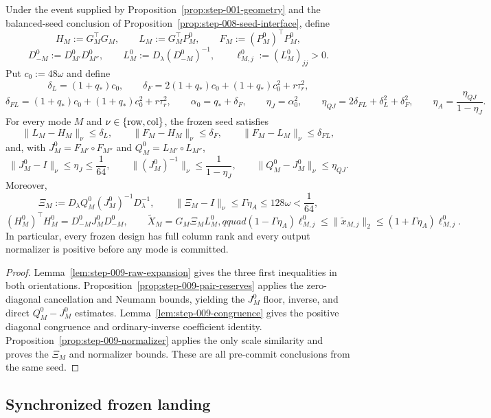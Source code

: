 \begin{proposition}
\label{prop:complete-frozen-reserve-interface}
Under the event supplied by Proposition~\ref{prop:step-001-geometry} and the
balanced-seed conclusion of Proposition~\ref{prop:step-008-seed-interface},
define
\[
H_M:=G_M^\top G_M,\qquad L_M:=G_M^\top P_M^0,\qquad
F_M:=(P_M^0)^\top P_M^0,
\]
\[
D_{-M}^0:=D_{M'}^0D_{M''}^0,\qquad
L_M^0:=D_\lambda(D_{-M}^0)^{-1},\qquad
\ell_{M,j}^0:=(L_M^0)_{jj}>0.
\]
Put $c_0:=48\omega$ and define
\[
\delta_L=(1+q_*)c_0,\qquad
\delta_F=2(1+q_*)c_0+(1+q_*)c_0^2+r\tau_r^2,
\]
\[
\delta_{FL}=(1+q_*)c_0+(1+q_*)c_0^2+r\tau_r^2,\qquad
\alpha_0=q_*+\delta_F,\qquad
\eta_J=\alpha_0^2,\qquad
\eta_{QJ}=2\delta_{FL}+\delta_L^2+\delta_F^2,\qquad
\eta_A=\frac{\eta_{QJ}}{1-\eta_J}.
\]
For every mode $M$ and $\nu\in\{{\rm row},{\rm col}\}$, the frozen seed
satisfies
\[
\|L_M-H_M\|_\nu\le\delta_L,\qquad
\|F_M-H_M\|_\nu\le\delta_F,\qquad
\|F_M-L_M\|_\nu\le\delta_{FL},
\]
and, with $J_M^0=F_{M'}\circ F_{M''}$ and
$Q_M^0=L_{M'}\circ L_{M''}$,
\[
\|J_M^0-I\|_\nu\le\eta_J\le\frac1{64},\qquad
\|(J_M^0)^{-1}\|_\nu\le\frac1{1-\eta_J},\qquad
\|Q_M^0-J_M^0\|_\nu\le\eta_{QJ}.
\]
Moreover,
\[
\Xi_M:=D_\lambda Q_M^0(J_M^0)^{-1}D_\lambda^{-1},\qquad
\|\Xi_M-I\|_\nu\le\Gamma\eta_A\le128\omega<\frac1{64},
\]
\[
(H_M^0)^\top H_M^0=D_{-M}^0J_M^0D_{-M}^0,\qquad
\widetilde X_M=G_M\Xi_ML_M^0,qquad
(1-\Gamma\eta_A)\ell_{M,j}^0
\le\|\widetilde x_{M,j}\|_2
\le(1+\Gamma\eta_A)\ell_{M,j}^0.
\]
In particular, every frozen design has full column rank and every output
normalizer is positive before any mode is committed.

\begin{proof}
Lemma~\ref{lem:step-009-raw-expansion} gives the three first inequalities in
both orientations. Proposition~\ref{prop:step-009-pair-reserves} applies the
zero-diagonal cancellation and Neumann bounds, yielding the $J_M^0$ floor,
inverse, and direct $Q_M^0-J_M^0$ estimates. Lemma~\ref{lem:step-009-congruence}
gives the positive diagonal congruence and ordinary-inverse coefficient
identity. Proposition~\ref{prop:step-009-normalizer} applies the only scale
similarity and proves the $\Xi_M$ and normalizer bounds. These are all
pre-commit conclusions from the same seed.
\end{proof}
\end{proposition}

\subsection{Synchronized frozen landing}\label{app:step-010}

